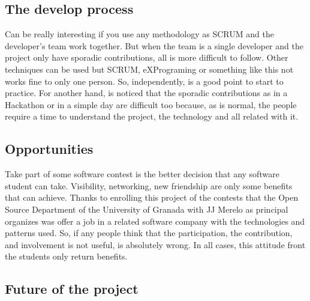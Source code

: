 \subsection{The develop process}

Can be really interesting if you use any methodology as SCRUM and the developer's
team work together. But when the team is a single developer and the project only
have sporadic contributions,
all is more difficult to follow. Other techniques can be used but SCRUM, eXPrograming
or something like this not works fine to only one person.
\intro
So, independently, is a good point to start to practice. For another hand, is
noticed that the sporadic contributions as in a Hackathon or in a simple day are
difficult too because, as is normal, the people require a time to understand the
project, the technology and all related with it.

\subsection{Opportunities}

Take part of some software contest is the better decision that any
software student can take. Visibility, networking, new friendship are only some
benefits that can achieve.
\intro
Thanks to enrolling this project of the contests that the Open Source Department of
the University of Granada with JJ Merelo as principal organizes was offer a job
in a related software company with the technologies and patterns used.
So, if any people think that the participation, the contribution, and involvement
is not useful, is absolutely wrong. In all cases, this attitude front the
students only return benefits.

\subsection{Future of the project}

